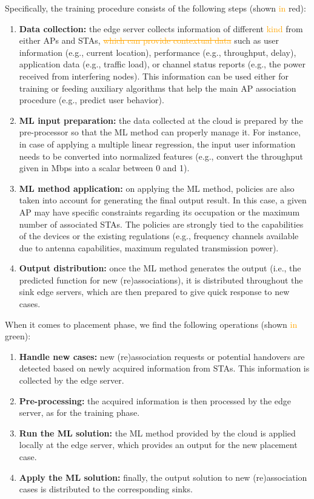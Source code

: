 \documentclass[journal]{IEEEtran}
\begin{document}
Specifically, the training procedure consists of the following steps (shown \textcolor{orange}{in} red):
\begin{enumerate}
	\item \textbf{Data collection:} the edge server collects information of different \textcolor{orange}{kind} from either APs and STAs, \textcolor{orange}{\st{which can provide contextual data}} such as user information (e.g., current location), performance (e.g., throughput, delay), application data (e.g., traffic load), or channel status reports (e.g., the power received from interfering nodes). This information can be used either for training or feeding auxiliary algorithms that help the main AP association procedure (e.g., predict user behavior).
	\item \textbf{ML input preparation:} the data collected at the cloud is prepared by the pre-processor so that the ML method can properly manage it. For instance, in case of applying a multiple linear regression, the input user information needs to be converted into normalized features (e.g., convert the throughput given in Mbps into a scalar between 0 and 1).
	\item \textbf{ML method application:} on applying the ML method, policies are also taken into account for generating the final output result. In this case, a given AP may have specific constraints regarding its occupation or the maximum number of associated STAs. The policies are strongly tied to the capabilities of the devices or the existing regulations (e.g., frequency channels available due to antenna capabilities, maximum regulated transmission power).
	\item \textbf{Output distribution:} once the ML method generates the output (i.e., the predicted function for new (re)associations), it is distributed throughout the sink edge servers, which are then prepared to give quick response to new cases.
\end{enumerate}

When it comes to placement phase, we find the following operations (shown \textcolor{orange}{in} green):
\begin{enumerate}
	\item \textbf{Handle new cases:} new (re)association requests or potential handovers are detected based on newly acquired information from STAs. This information is collected by the edge server.
	\item \textbf{Pre-processing:} the acquired information is then processed by the edge server, as for the training phase.
	\item \textbf{Run the ML solution:} the ML method provided by the cloud is applied locally at the edge server, which provides an output for the new placement case.
	\item \textbf{Apply the ML solution:} finally, the output solution to new (re)association cases is distributed to the corresponding sinks.
\end{enumerate}
\end{document}
